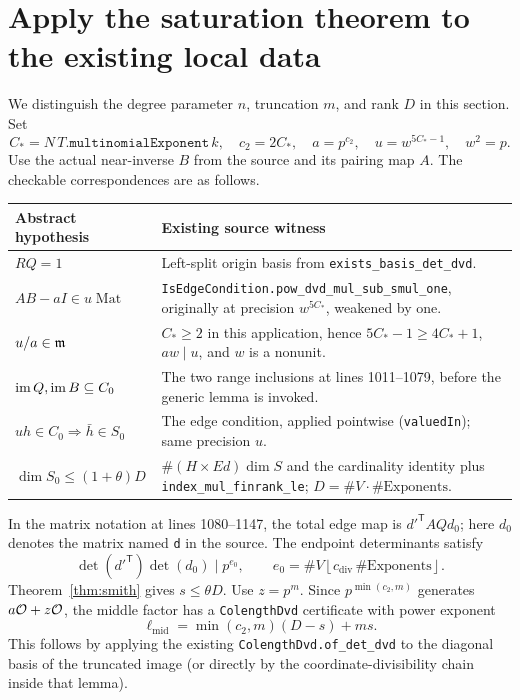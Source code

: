 \documentclass[11pt]{article}
\theoremstyle{remark}\newtheorem{remark}[theorem]{Remark}
\newcommand{\code}[1]{\texttt{#1}}
\begin{document}
\section{Apply the saturation theorem to the existing local data}\label{sec:apply}
We distinguish the degree parameter $n$, truncation $m$, and rank $D$ in this section. Set
\[
 C_* = N\,T.\code{multinomialExponent}\,k,\quad
 c_2=2C_*,\quad a=p^{c_2},\quad u=w^{5C_*-1},\quad w^2=p.
\]
Use the actual near-inverse $B$ from the source and its pairing map $A$. The checkable correspondences are as follows.
\begin{center}\small
\begin{tabular}{p{.27\linewidth}p{.62\linewidth}}\toprule
Abstract hypothesis & Existing source witness \\\midrule
$RQ=1$ & Left-split origin basis from \code{exists\_basis\_det\_dvd}.\\
$AB-aI\in u\operatorname{Mat}$ & \code{IsEdgeCondition.pow\_dvd\_mul\_sub\_smul\_one}, originally at precision $w^{5C_*}$, weakened by one.\\
$u/a\in\mathfrak m$ & $C_*\geq2$ in this application, hence $5C_*-1\geq4C_*+1$, $aw\mid u$, and $w$ is a nonunit.\\
$\operatorname{im} Q,\operatorname{im} B\subseteq C_0$ & The two range inclusions at lines 1011--1079, before the generic lemma is invoked.\\
$uh\in C_0\Rightarrow\bar h\in S_0$ & The edge condition, applied pointwise (\code{valuedIn}); same precision $u$.\\
$\dim S_0\leq (1+\theta)D$ & $\#(H\times Ed)\dim S$ and the cardinality identity plus \code{index\_mul\_finrank\_le}; $D=\#V\cdot\#\mathrm{Exponents}$.\\\bottomrule
\end{tabular}
\end{center}
In the matrix notation at lines 1080--1147, the total edge map is $d'^{\mathsf T}AQd_0$; here $d_0$ denotes the matrix named \code{d} in the source. The endpoint determinants satisfy
\[
 \det(d'^{\mathsf T})\det(d_0)\mid p^{e_0},\qquad
 e_0=\#V\left\lfloor c_{\mathrm{div}}\,\#\mathrm{Exponents}\right\rfloor.
\]
Theorem~\ref{thm:smith} gives $s\leq\theta D$. Use $z=p^m$. Since $p^{\min(c_2,m)}$ generates $a\mathcal O+z\mathcal O$, the middle factor has a \code{ColengthDvd} certificate with power exponent
\begin{equation}\label{eq:middle}
 \ell_{\mathrm{mid}}=\min(c_2,m)(D-s)+ms.
\end{equation}
This follows by applying the existing \code{ColengthDvd.of\_det\_dvd} to the diagonal basis of the truncated image (or directly by the coordinate-divisibility chain inside that lemma).
\end{document}
